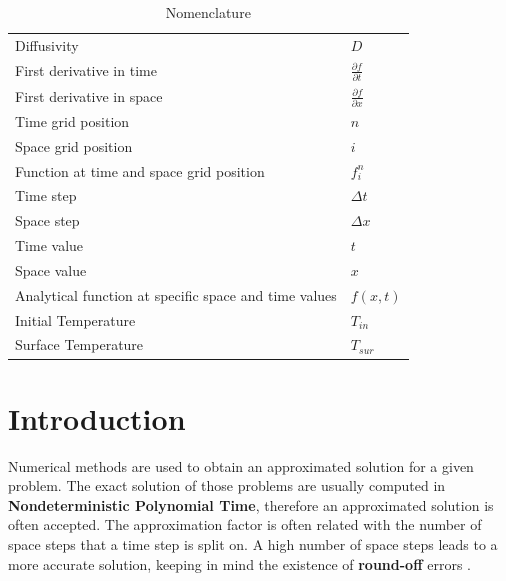 \documentclass[12pt]{article}
\begin{document}

\begin{table}[tb]
\caption{Nomenclature}
\label{tab:notation}
\centering
\def\arraystretch{1.5}
\begin{tabular}{ll}
Diffusivity & $D$\\
First derivative in time & $\frac{\partial f}{\partial t}$\\
First derivative in space & $\frac{\partial f}{\partial x}$\\
Time grid position & $n$\\
Space grid position & $i$\\
Function at time and space grid position & $f_i^n$\\
Time step & $\Delta t$\\
Space step & $\Delta x$\\
Time value & $t$\\
Space value & $x$\\
Analytical function at specific space and time values& $f(x, t)$\\
Initial Temperature& $T_{in}$\\
Surface Temperature& $T_{sur}$\\
\end{tabular}
\end{table}


\section*{Introduction}

Numerical methods are used to obtain an approximated solution for a given problem. The exact solution of those problems are usually computed in \textbf{Nondeterministic Polynomial Time}, therefore an approximated solution is often accepted. The approximation factor is often related with the number of space steps that a time step is split on. A high number of space steps leads to a more accurate solution, keeping in mind the existence of \textbf{round-off} errors \cite{fraga}.
\end{document}
